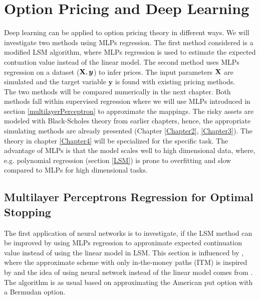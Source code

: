 
\chapter{Option Pricing and Deep Learning} %

\label{Chapter5} %

Deep learning can be applied to option pricing theory in different ways. We will investigate two methods using MLPs regression. The first method considered is a modified LSM algorithm, where MLPs regression is used to estimate the expected contuation value instead of the linear model. The second method uses MLPs regression on a dataset ($\mathbf{X}, \bm{y}$) to infer prices. The input parameters $\mathbf{X}$ are simulated and the target variable $\bm{y}$ is found with existing pricing methods.\\

The two methods will be compared numerically in the next chapter. Both methods fall within supervised regression where we will use MLPs introduced in section \ref{multilayerPerceptron} to approximate the mappings. The risky assets are modeled with Black-Scholes theory from earlier chapters, hence, the appropriate simulating methods are already presented (Chapter \ref{Chapter2}, \ref{Chapter3}). The theory in chapter \ref{Chapter4} will be specialized for the specific task. The advantage of MLPs is that the model scales well to high dimensional data, where, e.g. polynomial regression (section \ref{LSM}) is prone to overfitting and slow compared to MLPs for high dimensional tasks. 

\section{Multilayer Perceptrons Regression for Optimal Stopping}
The first application of neural networks is to investigate, if the LSM method can be improved by using MLPs regression to approximate expected continuation value instead of using the linear model in LSM. This section is influenced by \parencite{LSM, Lelong19, KohlerMichael2010}, where the approximate scheme with only in-the-money paths (ITM) is inspired by \parencite{LSM} and the idea of using neural network instead of the linear model comes from \parencite{KohlerMichael2010, Lelong19}. The algorithm is as usual based on approximating the American put option with a Bermudan option. \\

